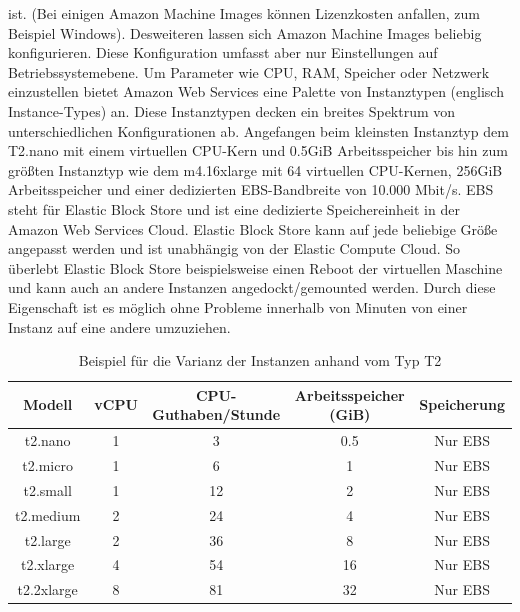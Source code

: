 \documentclass[titlepage]{report}
\begin{document}
ist. (Bei einigen Amazon Machine Images können Lizenzkosten anfallen,
zum Beispiel Windows). Desweiteren lassen sich Amazon Machine Images
beliebig konfigurieren. Diese Konfiguration umfasst aber nur
Einstellungen auf Betriebssystemebene. Um Parameter wie CPU, RAM,
Speicher oder Netzwerk einzustellen bietet Amazon Web Services eine
Palette von Instanztypen (englisch Instance\hyp{}Types) an.  Diese
Instanztypen decken ein breites Spektrum von unterschiedlichen
Konfigurationen ab. Angefangen beim kleinsten Instanztyp dem T2.nano mit
einem virtuellen CPU\hyp{}Kern und 0.5GiB Arbeitsspeicher bis hin zum
größten Instanztyp wie dem m4.16xlarge mit 64 virtuellen
CPU\hyp{}Kernen, 256GiB Arbeitsspeicher und einer dedizierten
EBS\hyp{}Bandbreite von 10.000 Mbit/s.  \cite{instance} EBS steht
für Elastic Block Store und ist eine dedizierte Speichereinheit in der
Amazon Web Services Cloud. Elastic Block Store kann auf jede beliebige
Größe angepasst werden und ist unabhängig von der Elastic Compute Cloud.
So überlebt Elastic Block Store beispielsweise einen Reboot der
virtuellen Maschine und kann auch an andere Instanzen
angedockt/gemounted werden. Durch diese Eigenschaft ist es möglich ohne
Probleme innerhalb von Minuten von einer Instanz auf eine andere
umzuziehen.
\begin{table}[h]
    \centering
    \caption{Beispiel für die Varianz der Instanzen anhand vom Typ T2\cite{instance}}
    \label{tab:1}
\begin{tabular}{|c|c|c|c|c|}
\hline
Modell     & vCPU & CPU\hyp{}Guthaben/Stunde & Arbeitsspeicher (GiB) & Speicherung \\ \hline
t2.nano    & 1    & 3                   & 0.5                   & Nur EBS     \\
t2.micro   & 1    & 6                   & 1                     & Nur EBS     \\
t2.small   & 1    & 12                  & 2                     & Nur EBS     \\
t2.medium  & 2    & 24                  & 4                     & Nur EBS     \\
t2.large   & 2    & 36                  & 8                     & Nur EBS     \\
t2.xlarge  & 4    & 54                  & 16                    & Nur EBS     \\
t2.2xlarge & 8    & 81                  & 32                    & Nur EBS     \\ \hline
\end{tabular}
\end{table}
\end{document}
